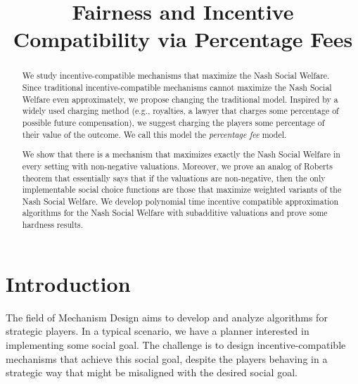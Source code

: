 \documentclass{theoretics}
\title{Fairness and Incentive Compatibility via Percentage Fees}
\begin{document}


\maketitle

\begin{abstract}
We study incentive-compatible mechanisms that maximize the Nash Social Welfare. Since traditional incentive-compatible mechanisms cannot maximize the Nash Social Welfare even approximately, we propose changing the traditional model. Inspired by a widely used charging method (e.g., royalties, a lawyer that charges some percentage of possible future compensation), we suggest charging the players some percentage of their value of the outcome. We call this model the \emph{percentage fee} model.

We show that there is a mechanism that maximizes exactly the Nash Social Welfare in every setting with non-negative valuations. Moreover, we prove an analog of Roberts theorem that essentially says that if the valuations are non-negative, then the only implementable social choice functions are those that maximize weighted variants of the Nash Social Welfare. We develop polynomial time incentive compatible approximation algorithms for the Nash Social Welfare with subadditive valuations and prove some hardness results. 
\end{abstract}

\section{Introduction}

The field of Mechanism Design aims to develop and analyze algorithms for strategic players. In a typical scenario, we have a planner interested in implementing some social goal. The challenge is to design incentive-compatible mechanisms that achieve this social goal, despite the players behaving in a strategic way that might be misaligned with the desired social goal.
\end{document}
